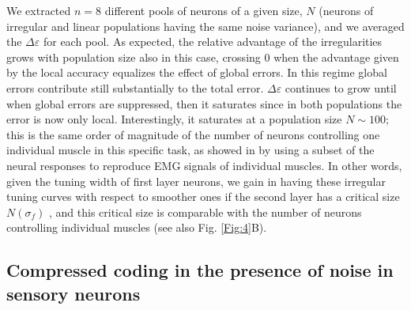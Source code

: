 \documentclass[a4paper]{article}
\begin{document}
We extracted $n=8$ different pools of neurons of a given size, $N$ (neurons of irregular and linear populations having the same noise variance), and we averaged the $\Delta \varepsilon$ for each pool. As expected, the relative advantage of the irregularities grows with population size also in this case, crossing $0$ when the advantage given by the local accuracy equalizes the effect of global errors. In this regime global errors contribute still substantially to the total error. $\Delta \varepsilon$  continues to grow until when global errors are suppressed, then it saturates since in both populations the error is now only local. Interestingly, it saturates at a population size  $N\sim 100$; this is the same order of magnitude of the number of neurons controlling one individual muscle in this specific task, as showed in \cite{Lalazar2016TuningConnectivity} by using a subset of the neural responses to reproduce EMG signals of individual muscles.  In other words, given the tuning width of first layer neurons, we gain in having these irregular tuning curves with respect to smoother ones if the second layer has a critical size $N(\sigma_f)$ , and this critical size is comparable with the number of neurons controlling individual muscles (see also Fig. \ref{Fig:4}B).

\subsection{Compressed coding in the presence of noise in sensory neurons}
\label{SuSe:In}
\end{document}

